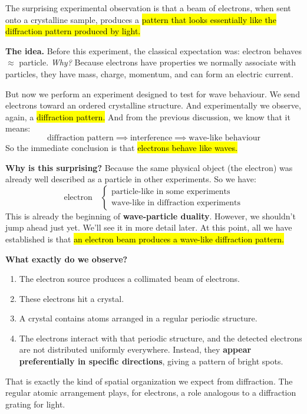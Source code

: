 \highspace
The surprising experimental observation is that a beam of electrons, when sent onto a crystalline sample, produces a \hl{pattern that looks essentially like the diffraction pattern produced by light.}

\highspace
\textcolor{Green3}{ \textbf{The idea.}} Before this experiment, the classical expectation was: electron behaves $\approx$ particle. \emph{Why?} Because electrons have properties we normally associate with particles, they have mass, charge, momentum, and can form an electric current.

\highspace
But now we perform an experiment designed to test for wave behaviour. We send electrons toward an ordered crystalline structure. And experimentally we observe, again, a \hl{diffraction pattern.} And from the previous discussion, we know that it means:
\begin{equation*}
    \text{diffraction pattern} \implies \text{interference} \implies \text{wave-like behaviour}
\end{equation*}
So the immediate conclusion is that \hl{electrons behave like waves.}

\highspace
\textcolor{Green3}{ \textbf{Why is this surprising?}} Because the same physical object (the electron) was already well described as a particle in other experiments. So we have:
\begin{equation*}
    \text{electron}
    \quad
    \begin{cases}
        \text{particle-like in some experiments}\\
        \text{wave-like in diffraction experiments}
    \end{cases}
\end{equation*}
This is already the beginning of \textbf{wave-particle duality}. However, we shouldn't jump ahead just yet. We'll see it in more detail later. At this point, all we have established is that \hl{an electron beam produces a wave-like diffraction pattern.}

\highspace
\textcolor{Green3}{ \textbf{What exactly do we observe?}}
\begin{enumerate}
    \item The electron source produces a collimated beam of electrons.
    \item These electrons hit a crystal.
    \item A crystal contains atoms arranged in a regular periodic structure.
    \item The electrons interact with that periodic structure, and the detected electrons are not distributed uniformly everywhere. Instead, they \textbf{appear preferentially in specific directions}, giving a pattern of bright spots.
\end{enumerate}
That is exactly the kind of spatial organization we expect from diffraction. The regular atomic arrangement plays, for electrons, a role analogous to a diffraction grating for light.

